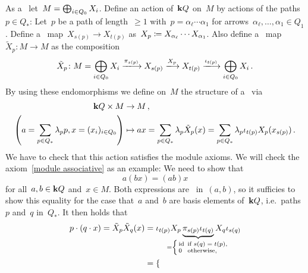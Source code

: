 \begin{remark}
\begin{enumerate}
      As a~{\module{$\kf$}} let~$M = \bigoplus_{i \in Q_0} X_i$.
      Define an action of~$\mathbf{k} Q$ on~$M$ by actions of the paths~$p \in Q_*$:
      Let~$p$ be a path of length~$\geq 1$ with~$p = \alpha_\ell \dotsm \alpha_1$ for arrows~$\alpha_\ell, \dotsc, \alpha_1 \in Q_1$.
      Define a~{\klin} map~$X_{s(p)} \to X_{t(p)}$ as~$X_p \coloneqq X_{\alpha_\ell} \dotsm X_{\alpha_1}$.
      Also define a~{\klin} map~$\tilde{X}_p \colon M \to M$ as the composition
      \[
          \tilde{X}_p
        \colon
          M
        =
          \bigdsum_{i \in Q_0} X_i
        \xlongto{\pi_{s(p)}}
          X_{s(p)}
        \xlongto{X_p}
          X_{t(p)}
        \xlongto{\iota_{t(p)}}
          \bigdsum_{i \in Q_0} X_i \,.
      \]
      By using these endomorphisms we define on~$M$ the structure of a~{} via
      \begin{align*}
              \mathbf{k} Q \times M
        &\to  M \,,
        \\
                  \left(
                    a = \sum_{p \in Q_*} \lambda_p p,
                    x = (x_i)_{i \in Q_0}
                  \right)
        &\mapsto  ax
         =        \sum_{p \in Q_*} \lambda_p \tilde{X}_p(x)
         =        \sum_{p \in Q_*} \lambda_p \iota_{t(p)} X_p( x_{s(p)} ) \,.
      \end{align*}
      We have to check that this action satisfies the module axioms.
      We will check the axiom~\ref{module associative} as an example:
      We need to show that
      \[
          a(bx)
        = (ab)x
      \]
      for all~$a, b \in \mathbf{k} Q$ and~$x \in M$.
      Both expressions are~{\kbilin} in~$(a,b)$, so it sufficies to show this equality for the case that~$a$ and~$b$ are basis elements of~$\mathbf{k} Q$, i.e.\ paths~$p$ and~$q$ in~$Q_*$.
      It then holds that
      \begin{align*}
          p \cdot (q \cdot x)
        = \tilde{X}_p \tilde{X}_q(x)
        &= \iota_{t(p)} X_p
          \underbrace{ \pi_{s(p)} \iota_{t(q)} }_{\mathclap{
            = \left\{
                \begingroup
                \renewcommand{\thickspace}{\kern 0.4em} %
                \begin{smallmatrix*}[l]
                  \id & \text{if~$s(q) = t(p)$},  \\
                  0   & \text{otherwise},
                \end{smallmatrix*}
                \endgroup
              \right.
          }}
          X_q \iota_{s(q)}
        \\
        &= \begin{cases}

\end{cases}
\end{align*}
\end{enumerate}
\end{remark}
